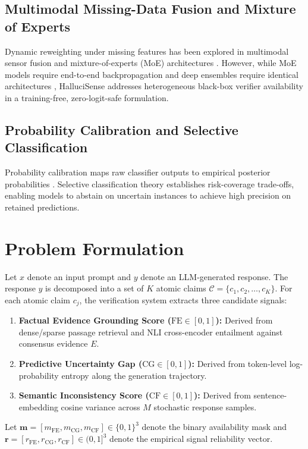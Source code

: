 \documentclass[11pt,a4paper]{article}
\begin{document}
\subsection{Multimodal Missing-Data Fusion and Mixture of Experts}
Dynamic reweighting under missing features has been explored in multimodal sensor fusion \citep{baltrusaitis2018multimodal} and mixture-of-experts (MoE) architectures \citep{shazeer2017outrageously}. However, while MoE models require end-to-end backpropagation and deep ensembles require identical architectures \citep{lakshminarayanan2017simple}, HalluciSense addresses heterogeneous black-box verifier availability in a training-free, zero-logit-safe formulation.

\subsection{Probability Calibration and Selective Classification}
Probability calibration maps raw classifier outputs to empirical posterior probabilities \citep{platt1999probabilistic}. Selective classification theory \citep{geifman2017selective} establishes risk-coverage trade-offs, enabling models to abstain on uncertain instances to achieve high precision on retained predictions.

\section{Problem Formulation}
\label{sec:problem_formulation}
Let $x$ denote an input prompt and $y$ denote an LLM-generated response. The response $y$ is decomposed into a set of $K$ atomic claims $\mathcal{C} = \{c_1, c_2, \dots, c_K\}$. For each atomic claim $c_j$, the verification system extracts three candidate signals:
\begin{enumerate}
    \item \textbf{Factual Evidence Grounding Score ($\text{FE} \in [0, 1]$):} Derived from dense/sparse passage retrieval and NLI cross-encoder entailment against consensus evidence $E$.
    \item \textbf{Predictive Uncertainty Gap ($\text{CG} \in [0, 1]$):} Derived from token-level log-probability entropy along the generation trajectory.
    \item \textbf{Semantic Inconsistency Score ($\text{CF} \in [0, 1]$):} Derived from sentence-embedding cosine variance across $M$ stochastic response samples.
\end{enumerate}

Let $\mathbf{m} = [m_{\text{FE}}, m_{\text{CG}}, m_{\text{CF}}] \in \{0, 1\}^3$ denote the binary availability mask and $\mathbf{r} = [r_{\text{FE}}, r_{\text{CG}}, r_{\text{CF}}] \in (0, 1]^3$ denote the empirical signal reliability vector.
\end{document}
